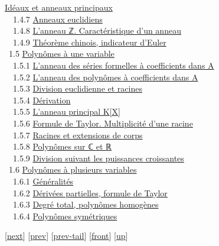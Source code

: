 \documentclass[]{article}
\begin{document}
\href{coursse4.html\#x8-320001.4.6}{Idéaux et anneaux principaux} \\
~~1.4.7 \href{coursse4.html\#x8-330001.4.7}{Anneaux euclidiens} \\
~~1.4.8 \href{coursse4.html\#x8-340001.4.8}{L'anneau ℤ. Caractéristique
d'un anneau} \\ ~~1.4.9 \href{coursse4.html\#x8-350001.4.9}{Théorème
chinois, indicateur d'Euler} \\ ~1.5
\href{coursse5.html\#x9-360001.5}{Polynômes à une variable} \\ ~~1.5.1
\href{coursse5.html\#x9-370001.5.1}{L'anneau des séries formelles à
coefficients dans A} \\ ~~1.5.2
\href{coursse5.html\#x9-380001.5.2}{L'anneau des polynômes à
coefficients dans A} \\ ~~1.5.3
\href{coursse5.html\#x9-390001.5.3}{Division euclidienne et racines} \\
~~1.5.4 \href{coursse5.html\#x9-400001.5.4}{Dérivation} \\ ~~1.5.5
\href{coursse5.html\#x9-410001.5.5}{L'anneau principal K{[}X{]}} \\
~~1.5.6 \href{coursse5.html\#x9-420001.5.6}{Formule de Taylor.
Multiplicité d'une racine} \\ ~~1.5.7
\href{coursse5.html\#x9-430001.5.7}{Racines et extensions de corps} \\
~~1.5.8 \href{coursse5.html\#x9-440001.5.8}{Polynômes sur ℂ et ℝ} \\
~~1.5.9 \href{coursse5.html\#x9-450001.5.9}{Division suivant les
puissances croissantes} \\ ~1.6
\href{coursse6.html\#x10-460001.6}{Polynômes à plusieurs variables} \\
~~1.6.1 \href{coursse6.html\#x10-470001.6.1}{Généralités} \\ ~~1.6.2
\href{coursse6.html\#x10-480001.6.2}{Dérivées partielles, formule de
Taylor} \\ ~~1.6.3 \href{coursse6.html\#x10-490001.6.3}{Degré total,
polynômes homogènes} \\ ~~1.6.4
\href{coursse6.html\#x10-500001.6.4}{Polynômes symétriques}

{[}\href{coursch3.html}{next}{]} {[}\href{coursli1.html}{prev}{]}
{[}\href{coursli1.html\#tailcoursli1.html}{prev-tail}{]}
{[}\href{coursch2.html}{front}{]}
{[}\href{cours.html\#coursch2.html}{up}{]}
\end{document}

